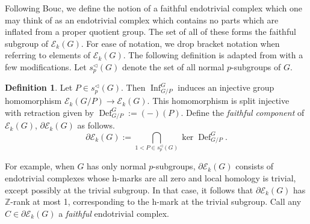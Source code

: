 \documentclass[10pt,letterpaper, boxed, cm]{amsart}
\newcommand{\Z}{\mathbb{Z}}
\newcommand{\Inf}{\operatorname{Inf}}
\newcommand{\Def}{\operatorname{Def}}
\newcommand{\calE}{\mathcal{E}}
\theoremstyle{remark}
\theoremstyle{definition}
\newtheorem{definition}[theorem]{Definition}
\begin{document}
	Following Bouc, we define the notion of a faithful endotrivial complex which one may think of as an endotrivial complex which contains no parts which are inflated from a proper quotient group. The set of all of these forms the faithful subgroup of $\calE_k(G)$. For ease of notation, we drop bracket notation when referring to elements of $\calE_k(G)$. The following definition is adapted from \cite[Chapter 6]{Bou10} with a few modifications. Let  $s_p^\triangleleft(G)$ denote the set of all normal $p$-subgroups of $G$.

	\begin{definition}\label{faithfuldef}
		Let $P \in s_p^\triangleleft(G)$. Then $\Inf^G_{G/P}$ induces an injective group homomorphism $\calE_k(G/P) \to \calE_k(G)$. This homomorphism is split injective with retraction given by $\Def^G_{G/P} := (-)(P)$. Define the \textit{faithful component} of $\calE_k(G)$, $\partial \calE_k(G)$ as follows.
		\[\partial \calE_k(G) := \bigcap_{1 < P \in s_p^\triangleleft(G)} \ker \Def^G_{G/P}.\]

		For example, when $G$ has only normal $p$-subgroups, $\partial \calE_k(G)$ consists of endotrivial complexes whose h-marks are all zero and local homology is trivial, except possibly at the trivial subgroup. In that case, it follows that $\partial\calE_k(G)$ has $\Z$-rank at most 1, corresponding to the h-mark at the trivial subgroup. Call any $C \in \partial \calE_k(G)$ a \textit{faithful} endotrivial complex.
	\end{definition}
\end{document}
